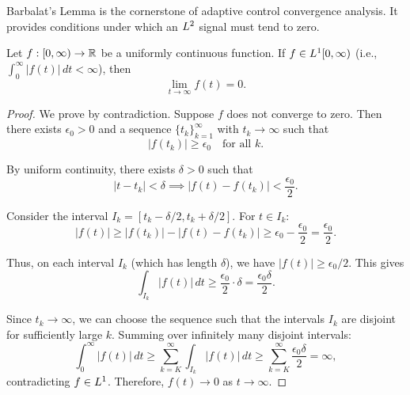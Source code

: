 Barbalat's Lemma is the cornerstone of adaptive control convergence analysis. It provides conditions under which an $L^{2}$ signal must tend to zero.

\begin{lemma}
\label{lem:barbalat}
Let $f: [0,\infty) \to \mathbb{R}$ be a uniformly continuous function. If $f \in L^{1}[0,\infty)$ (i.e., $\int_0^\infty |f(t)| \, dt < \infty$), then
\begin{equation}
    \lim_{t \to \infty} f(t) = 0.
\end{equation}
\end{lemma}

\begin{proof}
We prove by contradiction. Suppose $f$ does not converge to zero. Then there exists $\epsilon_0 > 0$ and a sequence $\{t_k\}_{k=1}^\infty$ with $t_k \to \infty$ such that
\begin{equation}
    |f(t_k)| \geq \epsilon_0 \quad \text{for all } k.
\end{equation}

By uniform continuity, there exists $\delta > 0$ such that
\begin{equation}
    |t - t_k| < \delta \implies |f(t) - f(t_k)| < \frac{\epsilon_0}{2}.
\end{equation}

Consider the interval $I_k = [t_k - \delta/2, t_k + \delta/2]$. For $t \in I_k$:
\begin{equation}
    |f(t)| \geq |f(t_k)| - |f(t) - f(t_k)| \geq \epsilon_0 - \frac{\epsilon_0}{2} = \frac{\epsilon_0}{2}.
\end{equation}

Thus, on each interval $I_k$ (which has length $\delta$), we have $|f(t)| \geq \epsilon_0/2$. This gives
\begin{equation}
    \int_{I_k} |f(t)| \, dt \geq \frac{\epsilon_0}{2} \cdot \delta = \frac{\epsilon_0 \delta}{2}.
\end{equation}

Since $t_k \to \infty$, we can choose the sequence such that the intervals $I_k$ are disjoint for sufficiently large $k$. Summing over infinitely many disjoint intervals:
\begin{equation}
    \int_0^\infty |f(t)| \, dt \geq \sum_{k=K}^\infty \int_{I_k} |f(t)| \, dt \geq \sum_{k=K}^\infty \frac{\epsilon_0 \delta}{2} = \infty,
\end{equation}
contradicting $f \in L^{1}$. Therefore, $f(t) \to 0$ as $t \to \infty$.
\end{proof}

